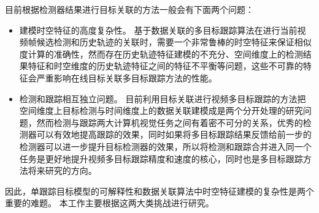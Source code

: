 目前根据检测器结果进行目标关联的方法一般会有下面两个问题：

\begin{itemize}
	\item 建模时空特征的高度复杂性。
	基于数据关联的多目标跟踪算法在进行当前视频帧候选检测和历史轨迹的关联时，需要一个非常鲁棒的时空特征来保证相似度计算的准确性，然而存在历史轨迹特征建模的不充分、空间维度上的检测结果特征和时空维度的历史轨迹特征之间的特征不平衡等问题，这些不可靠的特征会严重影响在线目标关联多目标跟踪方法的性能。
	
	\item 检测和跟踪相互独立问题。
	目前利用目标关联进行视频多目标跟踪的方法把空间维度上目标检测与时间维度上的数据关联建模成是两个分开处理的研究问题，然而检测与跟踪两大计算机视觉任务之间有着密不可分的关系，优秀的检测器可以有效地提高跟踪的效果，同时如果将多目标跟踪结果反馈给前一步的检测器可以进一步提升目标检测器的效果，所以将检测和跟踪合并进入同一个任务是更好地提升视频多目标跟踪精度和速度的核心，同时也是多目标跟踪方法将来研究的方向。
\end{itemize}

因此，单跟踪目标模型的可解释性和数据关联算法中时空特征建模的复杂性是两个重要的难题。
本工作主要根据这两大类挑战进行研究。


